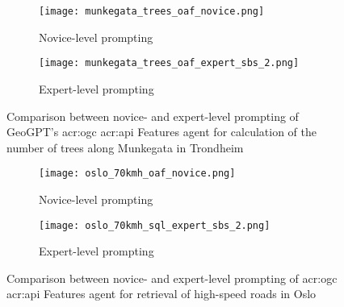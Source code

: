 \begin{figure}[htbp]
    \centering
    \begin{subfigure}[b]{0.7\textwidth}
        \centering
        \texttt{[image: munkegata\_trees\_oaf\_novice.png]}
        \caption{Novice-level prompting}
        \label{fig:novice-level-prompting-munkegata-trees}
    \end{subfigure}
    \hfill
    \begin{subfigure}[b]{0.7\textwidth}
        \centering
        \texttt{[image: munkegata\_trees\_oaf\_expert\_sbs\_2.png]}
        \caption{Expert-level prompting}
        \label{fig:expert-level-prompting-munkegata-trees}
    \end{subfigure}
    \caption{Comparison between novice- and expert-level prompting of GeoGPT's \acrshort{acr:ogc} \acrshort{acr:api} Features agent for calculation of the number of trees along Munkegata in Trondheim}
    \label{fig:novice-vs-expert-munkegata-trees}
\end{figure}


\begin{figure}[htbp]
    \centering
    \begin{subfigure}[b]{0.7\textwidth}
        \centering
        \texttt{[image: oslo\_70kmh\_oaf\_novice.png]}
        \caption{Novice-level prompting}
        \label{fig:novice-level-prompting-oslo-70kmh}
    \end{subfigure}
    \hfill
    \begin{subfigure}[b]{0.7\textwidth}
        \centering
        \texttt{[image: oslo\_70kmh\_sql\_expert\_sbs\_2.png]}
        \caption{Expert-level prompting}
        \label{fig:expert-level-prompting-oslo-70kmh}
    \end{subfigure}
    \caption{Comparison between novice- and expert-level prompting of \acrshort{acr:ogc} \acrshort{acr:api} Features agent for retrieval of high-speed roads in Oslo}
    \label{fig:novice-vs-expert-oslo-70kmh}
\end{figure}





\glsresetall


